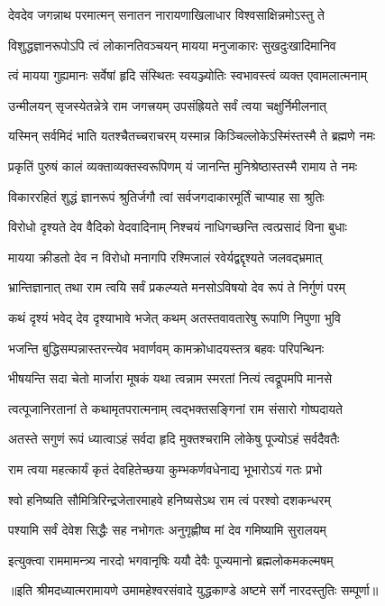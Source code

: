 


\addtocounter{shlokacount}{33}


\twolineshloka
{देवदेव जगन्नाथ परमात्मन् सनातन}
{नारायणाखिलाधार विश्वसाक्षिन्नमोऽस्तु ते} %

\twolineshloka
{विशुद्धज्ञानरूपोऽपि त्वं लोकानतिवञ्चयन्}
{मायया मनुजाकारः सुखदुःखादिमानिव} %

\twolineshloka
{त्वं मायया गुह्यमानः सर्वेषां हृदि संस्थितः}
{स्वयञ्ज्योतिः स्वभावस्त्वं व्यक्त एवामलात्मनाम्} %

\twolineshloka
{उन्मीलयन् सृजस्येतन्नेत्रे राम जगत्त्रयम्}
{उपसंह्रियते सर्वं त्वया चक्षुर्निमीलनात्} %

\twolineshloka
{यस्मिन् सर्वमिदं भाति यतश्चैतच्चराचरम्}
{यस्मान्न किञ्चिल्लोकेऽस्मिंस्तस्मै ते ब्रह्मणे नमः} %

\twolineshloka
{प्रकृतिं पुरुषं कालं व्यक्ताव्यक्तस्वरूपिणम्}
{यं जानन्ति मुनिश्रेष्ठास्तस्मै रामाय ते नमः} %

\twolineshloka
{विकाररहितं शुद्धं ज्ञानरूपं श्रुतिर्जगौ}
{त्वां सर्वजगदाकारमूर्तिं चाप्याह सा श्रुतिः} %

\twolineshloka
{विरोधो दृश्यते देव वैदिको वेदवादिनाम्}
{निश्चयं नाधिगच्छन्ति त्वत्प्रसादं विना बुधाः} %

\twolineshloka
{मायया क्रीडतो देव न विरोधो मनागपि}
{रश्मिजालं रवेर्यद्वद्दृश्यते जलवद्\mbox{}भ्रमात्} %

\twolineshloka
{भ्रान्तिज्ञानात् तथा राम त्वयि सर्वं प्रकल्प्यते}
{मनसोऽविषयो देव रूपं ते निर्गुणं परम्} %

\twolineshloka
{कथं दृश्यं भवेद् देव दृश्याभावे भजेत् कथम्}
{अतस्तवावतारेषु रूपाणि निपुणा भुवि} %

\twolineshloka
{भजन्ति बुद्धिसम्पन्नास्तरन्त्येव भवार्णवम्}
{कामक्रोधादयस्तत्र बहवः परिपन्थिनः} %

\twolineshloka
{भीषयन्ति सदा चेतो मार्जारा मूषकं यथा}
{त्वन्नाम स्मरतां नित्यं त्वद्रूपमपि मानसे} %

\twolineshloka
{त्वत्पूजानिरतानां ते कथामृतपरात्मनाम्}
{त्वद्भक्तसङ्गिनां राम संसारो गोष्पदायते} %

\twolineshloka
{अतस्ते सगुणं रूपं ध्यात्वाऽहं सर्वदा हृदि}
{मुक्तश्चरामि लोकेषु पूज्योऽहं सर्वदैवतैः} %

\twolineshloka
{राम त्वया महत्कार्यं कृतं देवहितेच्छया}
{कुम्भकर्णवधेनाद्य भूभारोऽयं गतः प्रभो} %

\twolineshloka
{श्वो हनिष्यति सौमित्रिरिन्द्रजेतारमाहवे}
{हनिष्यसेऽथ राम त्वं परश्वो दशकन्धरम्} %

\twolineshloka
{पश्यामि सर्वं देवेश सिद्धैः सह नभोगतः}
{अनुगृह्णीष्व मां देव गमिष्यामि सुरालयम्} %

\twolineshloka
{इत्युक्त्वा राममामन्त्र्य नारदो भगवानृषिः}
{ययौ देवैः पूज्यमानो ब्रह्मलोकमकल्मषम्} %

{॥इति श्रीमदध्यात्मरामायणे उमामहेश्वरसंवादे युद्धकाण्डे
अष्टमे सर्गे नारदस्तुतिः सम्पूर्णा॥}
